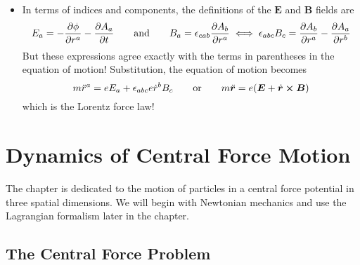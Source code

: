 \documentclass[11pt, a4paper]{article}
\newcommand{\eqtext}[1]{\qquad \text{#1} \qquad}
\newcommand{\bdot}[1]{\dot{\bm{#1}}} %
\newcommand{\bddot}[1]{\ddot{\bm{#1}}} %
\begin{document}
\begin{itemize}
	\item In terms of indices and components, the definitions of the $ \bm{E} $ and $ \bm{B} $ fields are
	\begin{equation*}
		E_{a} = -\pdv{\phi}{r^{a}} - \pdv{A_{a}}{t} \eqtext{and}  B_{a} = \epsilon_{cab}\pdv{A_{b}}{r^{a}} \iff \epsilon_{abc}B_{c} = \pdv{A_{b}}{r^{a}} - \pdv{A_{a}}{r^{b}}
	\end{equation*}
	But these expressions agree exactly with the terms in parentheses in the equation of motion! Substitution, the equation of motion becomes
	\begin{equation*}
		m\ddot{r}^{a} = e E_{a} + \epsilon_{abc} e \dot{r}^{b} B_{c} \eqtext{or} m \bddot{r} = e (\bm{E} + \bdot{r} \cross \bm{B})
	\end{equation*}
	which is the Lorentz force law!
	
\end{itemize}


\newpage
\section{Dynamics of Central Force Motion}
The chapter is dedicated to the motion of particles in a central force potential in three spatial dimensions. We will begin with Newtonian mechanics and use the Lagrangian formalism later in the chapter.

\subsection{The Central Force Problem}
\end{document}
